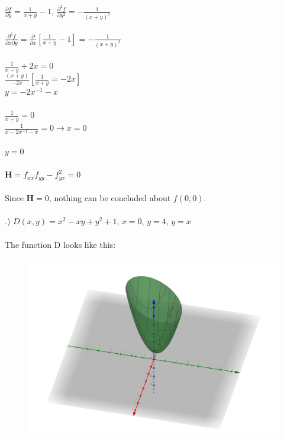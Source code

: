 \documentclass[12pt]{article}
\begin{document}
\noindent $\frac{\partial f}{\partial y} = \frac{1}{x + y} -1 $, \hspace{10pt} $\frac{\partial ^{2} f}{\partial y^{2}} = -\frac{1}{(x + y)^{2}}$\\\\
\noindent $\frac{\partial^{2} f}{\partial x \partial y } = \frac{\partial }{\partial x}[\frac{1}{x+y} -1 ] = -\frac{1}{(x + y)^{2}}$\\\\
\noindent $\frac{1}{x + y} + 2x= 0 $\\
\noindent $\frac{(x + y)}{-2x}[\frac{1}{x + y} = -2x]$\\
\noindent $y = -2x^{-1} - x$\\\\
\noindent $\frac{1}{x + y} = 0$\\
\noindent $\frac{1}{x  -2x^{-1} -x} = 0 \rightarrow x = 0$\\\\
\noindent $y = 0$\\\\
\noindent $\mathbf{H} = f_{xx}f_{yy} - f_{yx}^{2} = 0$\\\\
\noindent Since $\mathbf{H} = 0$, nothing can be concluded about $f(0, 0)$.\\\\
.) $D(x, y) = x^{2} - xy +y^{2} + 1$, \hspace{10pt} $x = 0$, \hspace{10pt} $y = 4$, \hspace{10pt} $y = x$\\\\
\noindent The function D looks like this:\\
\begin{figure}[!h]
\includegraphics{surface.png}
\end{figure}
\end{document}
